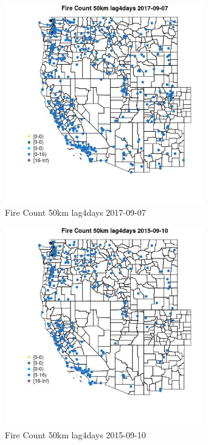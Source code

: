 \begin{figure} 
\centering  
\includegraphics[width=0.77\textwidth]{Code_Outputs/Report_ML_input_PM25_Step4_part_e_de_duplicated_aves_compiled_2019-05-21wNAs_MapObsFire_Count_50km_lag4days2017-09-07.jpg} 
\caption{\label{fig:Report_ML_input_PM25_Step4_part_e_de_duplicated_aves_compiled_2019-05-21wNAsMapObsFire_Count_50km_lag4days2017-09-07}Fire Count 50km lag4days 2017-09-07} 
\end{figure} 
 

\clearpage 

\begin{figure} 
\centering  
\includegraphics[width=0.77\textwidth]{Code_Outputs/Report_ML_input_PM25_Step4_part_e_de_duplicated_aves_compiled_2019-05-21wNAs_MapObsFire_Count_50km_lag4days2015-09-10.jpg} 
\caption{\label{fig:Report_ML_input_PM25_Step4_part_e_de_duplicated_aves_compiled_2019-05-21wNAsMapObsFire_Count_50km_lag4days2015-09-10}Fire Count 50km lag4days 2015-09-10} 
\end{figure} 
 

